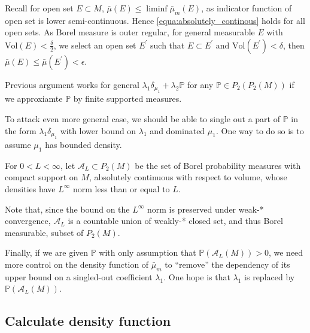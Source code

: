 Recall for open set $E \subset M$, $\bar{\mu}(E) \leq \liminf \bar{\mu}_m(E)$,
as indicator function of open set is lower semi-continuous.
Hence \cref{equa:absolutely_continous} holds for all open sets.
As Borel measure is outer regular, for general measurable $E$ with $\text{Vol}(E) < \frac{\delta}{2}$,
we select an open set $E^\prime$ such that
$ E \subset E^\prime$ and $ \text{Vol}(E^\prime) < \delta$,
then $\bar{\mu}(E) \leq \bar{\mu}(E^\prime) < \epsilon$.

Previous argument works for general $\lambda_1 \delta_{\mu_1} + \lambda_2 \mathbb{P}$ for any $\mathbb{P} \in P_2(P_2(M))$
if we approxiamte $\mathbb{P}$ by finite supported measures.

To attack even more general case,
we should be able to single out a part of $\mathbb{P}$ in the form $\lambda_1 \delta_{\mu_1}$
with lower bound on $\lambda_1$ and dominated $\mu_1$.
One way to do so is to assume $\mu_1$ has bounded density.
\begin{defn}
	For \( 0 < L < \infty \), let \( \mathcal { A } _ { L } \subset P_2(M) \) be the set of Borel probability
	measures with compact support on \( M \), absolutely continuous with respect to volume, whose densities have \( L ^ { \infty } \)
	norm less than or equal to \( L\).
\end{defn}

Note that, since the bound on the \( L ^ { \infty } \) norm is preserved under weak-* convergence,
\( \mathcal { A } _ { L } \) is a countable union of weakly-* closed set, and thus Borel measurable, subset of \( P_2( M ) \).


Finally, if we are given $\mathbb{P}$ with only assumption that $\mathbb{P}(\mathcal{A}_L(M)) > 0$,
we need more control on the density function of $\bar{\mu}_m$
to ``remove'' the dependency of its upper bound on a singled-out coefficient $\lambda_1$.
One hope is that $\lambda_1$ is replaced by $\mathbb{P}(\mathcal{A}_L(M))$.

\subsection{Calculate density function}

